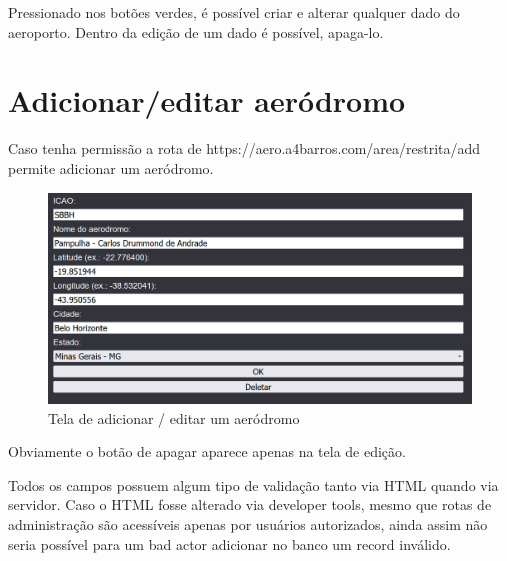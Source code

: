 Pressionado nos botões verdes, é possível criar e alterar qualquer dado do
aeroporto. Dentro da edição de um dado é possível, apaga-lo.

\section {Adicionar/editar aeródromo}
Caso tenha permissão a rota de
https://aero.a4barros.com/area/restrita/add permite adicionar um aeródromo. 

\begin{figure}[ht]
    \begin{center}
    \includegraphics[width=\linewidth]{img/area-restrita-aerodrome.png}
    \caption{Tela de adicionar / editar um aeródromo}
    \label{fig:max-priv-sys}
    \end{center}
\end{figure}

Obviamente o botão de apagar aparece apenas na tela de edição.

Todos os campos possuem algum tipo de validação tanto via HTML quando via servidor. 
Caso o HTML fosse alterado via developer tools, mesmo que rotas de administração 
são acessíveis apenas por usuários autorizados, ainda assim não seria possível 
para um bad actor adicionar no banco um record inválido.

